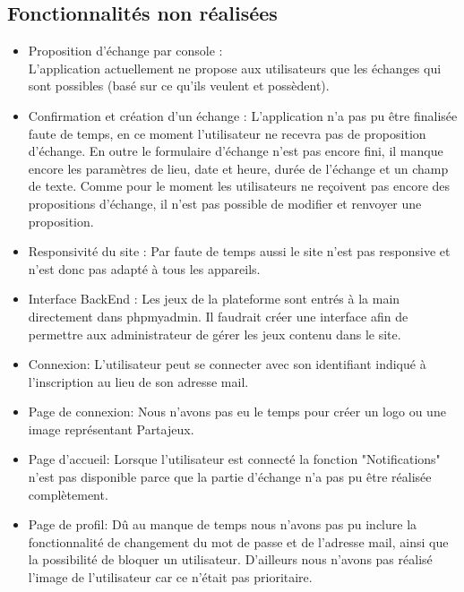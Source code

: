 \documentclass[a4paper,12pt,abstracton,titlepage]{scrartcl}
\begin{document}
\subsection{Fonctionnalités non réalisées}
\begin{itemize}
\item Proposition d'échange par console :\\
L'application actuellement ne propose aux utilisateurs que les échanges qui sont possibles (basé sur ce qu'ils veulent et possèdent).
\item Confirmation et création d'un échange : L'application n'a pas pu être finalisée faute de temps, en ce moment l'utilisateur ne recevra pas de proposition d'échange. En outre le formulaire d'échange n'est pas encore fini, il manque encore les paramètres de lieu, date et heure, durée de l'échange et un champ de texte. Comme pour le moment les utilisateurs ne reçoivent pas encore des propositions d'échange, il n'est pas possible de modifier et renvoyer une proposition.
\item Responsivité du site : Par faute de temps aussi le site n'est pas responsive et n'est donc pas adapté à tous les appareils.
\item Interface BackEnd : Les jeux de la plateforme sont entrés à la main directement dans phpmyadmin. Il faudrait créer une interface afin de permettre aux administrateur de gérer les jeux contenu dans le site.
 \item Connexion: L'utilisateur peut se connecter avec son identifiant indiqué à l'inscription au lieu de son adresse mail.
 \item Page de connexion: Nous n'avons pas eu le temps pour créer un logo ou une image représentant Partajeux.
 \item Page d'accueil: Lorsque l'utilisateur est connecté la fonction "Notifications" n'est pas disponible parce que la partie d'échange n'a pas pu être réalisée complètement.
 \item Page de profil: Dû au manque de temps nous n'avons pas pu inclure la fonctionnalité de changement du mot de passe et de l'adresse mail, ainsi que la possibilité de bloquer un utilisateur. D'ailleurs nous n'avons pas réalisé l'image de l'utilisateur car ce n'était pas prioritaire.
\end{itemize}
\end{document}
